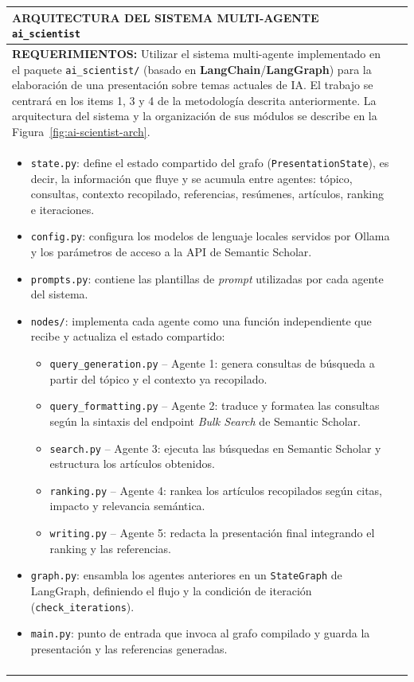 \documentclass[12pt]{article}
\begin{document}
\newpage
\noindent
\begin{tabular}{|p{\textwidth}|@{}c@{}}
	\hline
	\centering\cellcolor{cyan}\textbf{\color{white}ARQUITECTURA DEL SISTEMA MULTI-AGENTE \texttt{ai\_scientist}}&\\\hline

\textbf{REQUERIMIENTOS:}
  \vspace{3pt} Utilizar el sistema multi-agente implementado en el paquete \texttt{ai\_scientist/} (basado en \textbf{LangChain}/\textbf{LangGraph}) para la elaboración de una presentación sobre temas actuales de IA. El trabajo se centrará en los items 1, 3 y 4 de la metodología descrita anteriormente. La arquitectura del sistema y la organización de sus módulos se describe en la Figura~\ref{fig:ai-scientist-arch}.\\

\begin{itemize}
	\item \texttt{state.py}: define el estado compartido del grafo (\texttt{PresentationState}), es decir, la información que fluye y se acumula entre agentes: tópico, consultas, contexto recopilado, referencias, resúmenes, artículos, ranking e iteraciones.
	\item \texttt{config.py}: configura los modelos de lenguaje locales servidos por Ollama y los parámetros de acceso a la API de Semantic Scholar.
	\item \texttt{prompts.py}: contiene las plantillas de \textit{prompt} utilizadas por cada agente del sistema.
	\item \texttt{nodes/}: implementa cada agente como una función independiente que recibe y actualiza el estado compartido:
	\begin{itemize}
		\item \texttt{query\_generation.py} -- Agente 1: genera consultas de búsqueda a partir del tópico y el contexto ya recopilado.
		\item \texttt{query\_formatting.py} -- Agente 2: traduce y formatea las consultas según la sintaxis del endpoint \textit{Bulk Search} de Semantic Scholar.
		\item \texttt{search.py} -- Agente 3: ejecuta las búsquedas en Semantic Scholar y estructura los artículos obtenidos.
		\item \texttt{ranking.py} -- Agente 4: rankea los artículos recopilados según citas, impacto y relevancia semántica.
		\item \texttt{writing.py} -- Agente 5: redacta la presentación final integrando el ranking y las referencias.
	\end{itemize}
	\item \texttt{graph.py}: ensambla los agentes anteriores en un \texttt{StateGraph} de LangGraph, definiendo el flujo y la condición de iteración (\texttt{check\_iterations}).
	\item \texttt{main.py}: punto de entrada que invoca al grafo compilado y guarda la presentación y las referencias generadas.
\end{itemize}



	&\\&\\\hline
\end{tabular}
\end{document}
